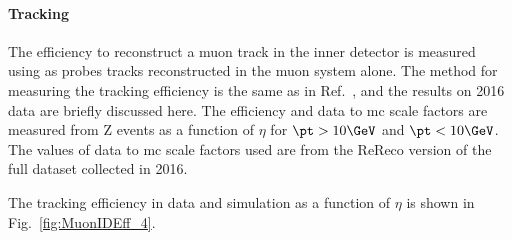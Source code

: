 
\paragraph*{Tracking}
The efficiency to reconstruct a muon track in the inner detector is measured using as probes tracks
reconstructed in the muon system alone. The method for measuring the tracking efficiency is the same as 
 in Ref.~\cite{CMS_AN_2015-215}, and the results on 2016 data are briefly discussed here. The efficiency and 
data to mc scale factors are measured from Z events as a function of $\eta$ for $\pt > 10\GeV$ and $\pt < 10\GeV$. The values of data to mc scale factors 
used are from the ReReco version of the full dataset collected in 2016. 

The tracking efficiency in data and simulation as a function of $\eta$ is shown in Fig.~\ref{fig:MuonIDEff_4}.

